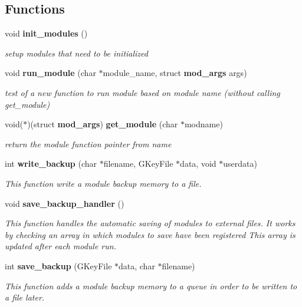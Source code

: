 \subsection*{Functions}
\begin{CompactItemize}
\item 
void {\bf init\_\-modules} ()
\begin{CompactList}\small\item\em setup modules that need to be initialized \item\end{CompactList}\item 
void {\bf run\_\-module} (char $\ast$module\_\-name, struct {\bf mod\_\-args} args)
\begin{CompactList}\small\item\em test of a new function to run module based on module name (without calling get\_\-module) \item\end{CompactList}\item 
void($\ast$)(struct {\bf mod\_\-args}) {\bf get\_\-module} (char $\ast$modname)
\begin{CompactList}\small\item\em return the module function pointer from name \item\end{CompactList}\item 
int {\bf write\_\-backup} (char $\ast$filename, GKeyFile $\ast$data, void $\ast$userdata)
\begin{CompactList}\small\item\em This function write a module backup memory to a file. \item\end{CompactList}\item 
void {\bf save\_\-backup\_\-handler} ()
\begin{CompactList}\small\item\em This function handles the automatic saving of modules to external files. It works by checking an array in which modules to save have been registered This array is updated after each module run. \item\end{CompactList}\item 
int {\bf save\_\-backup} (GKeyFile $\ast$data, char $\ast$filename)
\begin{CompactList}\small\item\em This function adds a module backup memory to a queue in order to be written to a file later. \item\end{CompactList}\end{CompactItemize}


